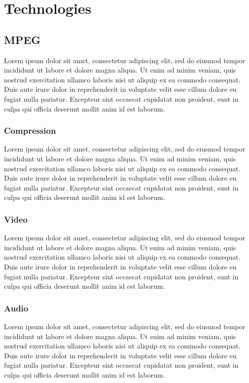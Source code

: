 %
%
\chapter{Technologies}


\section{MPEG}
Lorem ipsum dolor sit amet, consectetur adipiscing elit, sed do eiusmod tempor incididunt ut labore et dolore magna aliqua. Ut enim ad minim veniam, quis nostrud exercitation ullamco laboris nisi ut aliquip ex ea commodo consequat. Duis aute irure dolor in reprehenderit in voluptate velit esse cillum dolore eu fugiat nulla pariatur. Excepteur sint occaecat cupidatat non proident, sunt in culpa qui officia deserunt mollit anim id est laborum.

\subsection{Compression}
Lorem ipsum dolor sit amet, consectetur adipiscing elit, sed do eiusmod tempor incididunt ut labore et dolore magna aliqua. Ut enim ad minim veniam, quis nostrud exercitation ullamco laboris nisi ut aliquip ex ea commodo consequat. Duis aute irure dolor in reprehenderit in voluptate velit esse cillum dolore eu fugiat nulla pariatur. Excepteur sint occaecat cupidatat non proident, sunt in culpa qui officia deserunt mollit anim id est laborum.

\subsection{Video}
Lorem ipsum dolor sit amet, consectetur adipiscing elit, sed do eiusmod tempor incididunt ut labore et dolore magna aliqua. Ut enim ad minim veniam, quis nostrud exercitation ullamco laboris nisi ut aliquip ex ea commodo consequat. Duis aute irure dolor in reprehenderit in voluptate velit esse cillum dolore eu fugiat nulla pariatur. Excepteur sint occaecat cupidatat non proident, sunt in culpa qui officia deserunt mollit anim id est laborum.

\subsection{Audio}
Lorem ipsum dolor sit amet, consectetur adipiscing elit, sed do eiusmod tempor incididunt ut labore et dolore magna aliqua. Ut enim ad minim veniam, quis nostrud exercitation ullamco laboris nisi ut aliquip ex ea commodo consequat. Duis aute irure dolor in reprehenderit in voluptate velit esse cillum dolore eu fugiat nulla pariatur. Excepteur sint occaecat cupidatat non proident, sunt in culpa qui officia deserunt mollit anim id est laborum.

